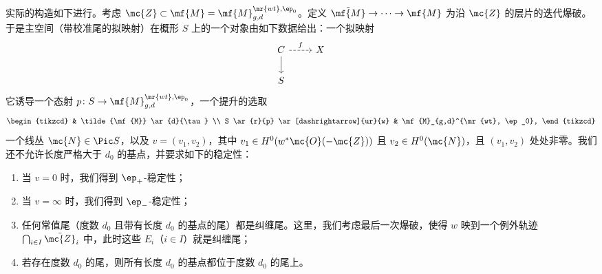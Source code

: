 实际的构造如下进行。考虑 \(\mc{Z} \subset \mf{M} = \mf{M}_{g,d}^{\mr{wt}, \ep_0}\)。定义 \(\tilde{\mf{M}} \to \cdots \to \mf{M}\) 为沿 \(\mc{Z}\) 的层片的迭代爆破。于是主空间（带校准尾的拟映射）在概形 \(S\) 上的一个对象由如下数据给出：一个拟映射
\begin{equation*}
\begin{tikzcd}
    C \ar{d} \ar[dashrightarrow]{r}{f} & X \\
    S
\end{tikzcd}
\end{equation*}
它诱导一个态射 \(p \colon S \to \mf{M}_{g,d}^{\mr{wt}, \ep_0}\)，一个提升的选取
\begin{equation*}
\begin{tikzcd}
    & \tilde{\mf{M}} \ar{d}{\tau} \\
    S \ar{r}{p} \ar[dashrightarrow]{ur}{w} & \mf{M}_{g,d}^{\mr{wt}, \ep_0},
\end{tikzcd}
\end{equation*}
一个线丛 \(\mc{N} \in \Pic S\)，以及 \(v = (v_1, v_2)\)，其中 \(v_1 \in H^0(w^* \mc{O}(-\mc{Z}))\) 且 \(v_2 \in H^0(\mc{N})\)，且 \((v_1, v_2)\) 处处非零。我们还不允许长度严格大于 \(d_0\) 的基点，并要求如下的稳定性：
\begin{enumerate}
    \item 当 \(v = 0\) 时，我们得到 \(\ep_+\)-稳定性；
    \item 当 \(v = \infty\) 时，我们得到 \(\ep_-\)-稳定性；
    \item 任何常值尾（度数 \(d_0\) 且带有长度 \(d_0\) 的基点的尾）都是纠缠尾。这里，我们考虑最后一次爆破，使得 \(w\) 映到一个例外轨迹 \(\bigcap_{i \in I} \tilde{\mc{Z}}_i\) 中，此时这些 \(E_i\)（\(i \in I\)）就是纠缠尾；
    \item 若存在度数 \(d_0\) 的尾，则所有长度 \(d_0\) 的基点都位于度数 \(d_0\) 的尾上。
\end{enumerate}






